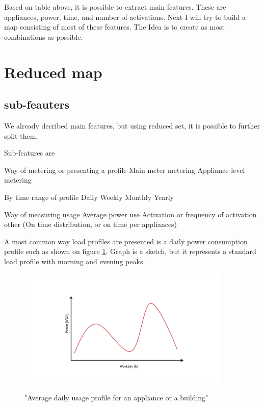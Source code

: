 Based on table above, it is possible to extract main features.
These are appliances, power, time, and number of activations.
Next I will try to build a map consisting of most of these features.
The Idea is to create as most combinations as possible.

\section{Reduced map}

\subsection{sub-feauters}

We already decribed main features, but using reduced set, it 
is possible to further split them.

Sub-features are 
\begin{outline}

\1 Way of metering or presenting a profile
\2 Main meter metering
\2 Appliance level metering

\1 By time range of profile 
\2 Daily
\2 Weekly
\2 Monthly
\2 Yearly

\1 Way of measuring usage
\2 Average power use 
\2 Activation or frequency of activation
\2 other (On time distribution, or on time per appliances)
\end{outline}

A most common way load profiles are presented is a daily power consumption profile such as shown on figure \ref{fig:daily_power_profile}. 
Graph is a sketch, but it represents a standard load profile with morning and evening peaks.

\begin{figure}[H]
	\centering
	\caption{"Average daily usage profile for an appliance or a building"}
	\includegraphics[width=0.9\textwidth]{Figures/profile_sketches/Slide1.png}
	\label{fig:daily_power_profile}
\end{figure}

